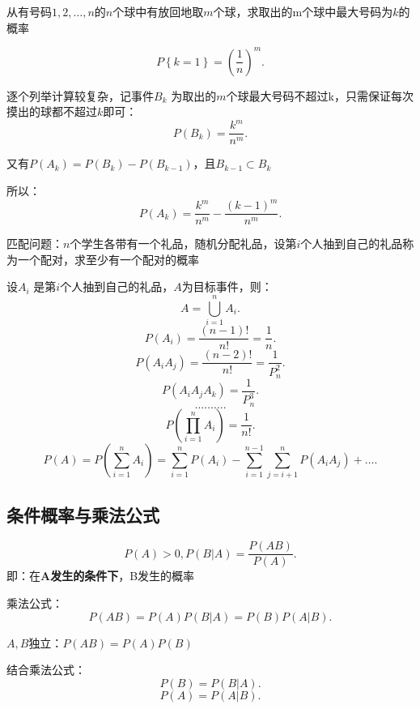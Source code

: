 \begin{eg}
    从有号码$1,2,\ldots,n$的$n$个球中有放回地取$m$个球，求取出的m个球中最大号码为$k$的概率

    \[
        P\left\{ k=1 \right\} =\left( \frac{1}{n} \right) ^m
    .\]  

    逐个列举计算较复杂，记事件$B_k$ 为取出的$m$个球最大号码不超过k，只需保证每次摸出的球都不超过$k$即可：
    \[
        P\left( B_{k} \right) =\frac{k^m}{n^m}
    .\] 

    又有$P\left( A_{k} \right) =P\left( B_{k} \right) -P\left( B_{k-1} \right) $，且$B_{k-1}\subset B_{k}$ 

    所以：\[
        P\left( A_k \right) =\frac{k^m}{n^m}-\frac{\left( k-1 \right) ^m}{n^m}
    .\] 
\end{eg}
 
\begin{eg}
    匹配问题：$n$个学生各带有一个礼品，随机分配礼品，设第$i$个人抽到自己的礼品称为一个配对，求至少有一个配对的概率

    设$A_{i}$ 是第$i$个人抽到自己的礼品，$A$为目标事件，则： \[
        A=\bigcup_{i=1}^{n}A_{i}
    .\] 
    \[
        P\left( A_{i} \right) =\frac{\left( n-1 \right) !}{n!}=\frac{1}{n}
    .\] 
    \[
        P\left( A_iA_j \right) =\frac{\left( n-2 \right) !}{n!}=\frac{1}{P_{n}^{2}}
    .\] 
    \[
        P\left( A_iA_jA_k \right) =\frac{1}{P_{n}^{3}}
    .\] 
    \[
        \ldots\ldots\ldots
    .\] 
    \[
        P\left( \prod_{i=1}^{n} A_i  \right) =\frac{1}{n!}
    .\] 
    \[
        P\left( A \right) =P\left( \sum_{i=1}^{n} A_{i} \right) = \sum_{i=1}^{n} P\left( A_{i} \right) -\sum_{i=1}^{n-1} \sum_{j=i+1}^{n} P\left( A_iA_j \right) +\ldots
    .\] 
\end{eg}
\subsection{条件概率与乘法公式}%
\label{sub:条件概率与乘法公式}
\begin{defi}
    \[
        P\left( A \right) >0,P\left( B | A \right) =\frac{P\left( AB \right) }{P\left( A \right) }
    .\] 
    即：在\textbf{A发生的条件下}，B发生的概率
\end{defi}
\begin{defi}
    乘法公式：\[
        P\left( AB \right) =P\left( A \right) P\left( B|A \right) =P\left( B \right) P\left( A|B \right) 
    .\] 
\end{defi}
\begin{notation}
    $A,B$独立：$P\left( AB \right) =P\left( A \right) P\left( B \right) $

    结合乘法公式：\[
        P\left( B \right) =P\left( B|A \right) 
    .\] 
    \[
        P\left( A \right) =P\left( A|B \right) 
    .\] 
\end{notation}
